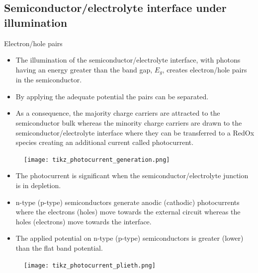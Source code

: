 \documentclass[10pt,compress]{beamer}
\begin{document}
\subsection{Semiconductor/electrolyte interface under illumination}
    \begin{frame}[allowframebreaks=1.0]{Electron/hole pairs}
    \begin{itemize} 
        \item The illumination of the semiconductor/electrolyte interface, 
        with photons having an energy greater than the band gap, $E_g$, creates 
        electron/hole pairs in the semiconductor. 
        \item By applying the adequate potential the pairs can be separated. 
        \item As a consequence, the majority charge carriers are attracted to the 
        semiconductor bulk whereas the minority charge carriers are drawn to the 
        semiconductor/electrolyte interface where they can be transferred to a RedOx 
        species creating an additional current called photocurrent. 
    \end{itemize}
    
    \begin{figure}[h]
        \centering
        \texttt{[image: tikz\_photocurrent\_generation.png]}
        \label{fig_photocurrent_generation}
    \end{figure}
    
    \begin{itemize}
        \item The photocurrent is significant when the semiconductor/electrolyte junction 
        is in depletion. 
        \item n-type (p-type) 
        semiconductors generate anodic (cathodic) photocurrents where the 
        electrons (holes) move towards the external circuit whereas the holes (electrons) 
        move towards the interface. 
        \item The applied potential on n-type (p-type) semiconductors is 
        greater (lower) than the flat band potential. 
    \end{itemize}

    \begin{figure}[h]
        \centering
        \texttt{[image: tikz\_photocurrent\_plieth.png]}
        \label{fig_photocurrent_plieth}
    \end{figure}

    \end{frame}
\end{document}
